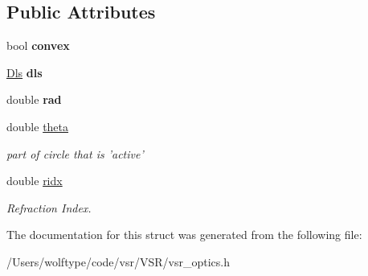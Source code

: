\subsection*{Public Attributes}
\begin{DoxyCompactItemize}
\item 
\hypertarget{structvsr_1_1_opt_surf_afc048ca17f11e5627e68c1cd6b4b97f5}{bool {\bfseries convex}}\label{structvsr_1_1_opt_surf_afc048ca17f11e5627e68c1cd6b4b97f5}

\item 
\hypertarget{structvsr_1_1_opt_surf_a60d0ff1320995cd5cea5ad16d55b314c}{\hyperlink{classvsr_1_1_m_v}{Dls} {\bfseries dls}}\label{structvsr_1_1_opt_surf_a60d0ff1320995cd5cea5ad16d55b314c}

\item 
\hypertarget{structvsr_1_1_opt_surf_a0ff00c310bc12a3c62bcb103a3a1489d}{double {\bfseries rad}}\label{structvsr_1_1_opt_surf_a0ff00c310bc12a3c62bcb103a3a1489d}

\item 
\hypertarget{structvsr_1_1_opt_surf_ac3dab50bf0d4a7f6c7f4537074e5b28c}{double \hyperlink{structvsr_1_1_opt_surf_ac3dab50bf0d4a7f6c7f4537074e5b28c}{theta}}\label{structvsr_1_1_opt_surf_ac3dab50bf0d4a7f6c7f4537074e5b28c}

\begin{DoxyCompactList}\small\item\em part of circle that is 'active' \end{DoxyCompactList}\item 
\hypertarget{structvsr_1_1_opt_surf_a0815467da24d81419a50f5eb449f71e9}{double \hyperlink{structvsr_1_1_opt_surf_a0815467da24d81419a50f5eb449f71e9}{ridx}}\label{structvsr_1_1_opt_surf_a0815467da24d81419a50f5eb449f71e9}

\begin{DoxyCompactList}\small\item\em Refraction Index. \end{DoxyCompactList}\end{DoxyCompactItemize}


The documentation for this struct was generated from the following file\-:\begin{DoxyCompactItemize}
\item 
/\-Users/wolftype/code/vsr/\-V\-S\-R/vsr\-\_\-optics.\-h\end{DoxyCompactItemize}
